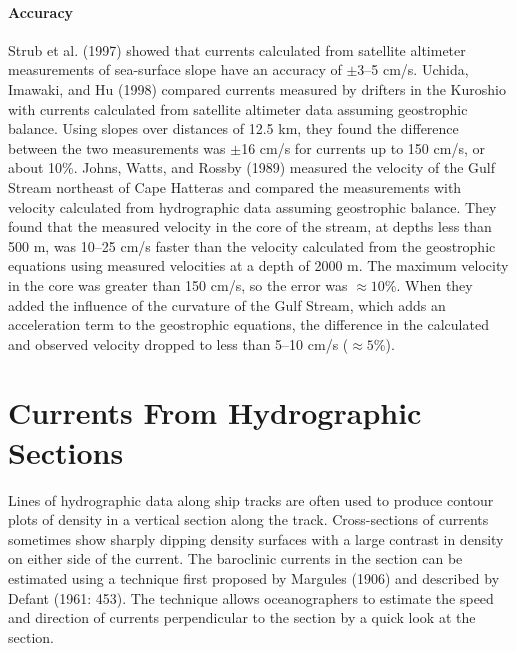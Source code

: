 \paragraph{Accuracy} Strub et al. (1997) showed that
currents calculated
from satellite altimeter measurements of sea-surface slope have an
accuracy of $\pm$3--5 cm/s. Uchida, Imawaki,
and Hu (1998) compared currents measured by drifters in the Kuroshio
with currents calculated from satellite altimeter data assuming
geostrophic balance. Using slopes over distances of 12.5 km, they
found the difference between the two measurements was $\pm$16 cm/s for
currents up to 150 cm/s, or about 10\%. Johns, Watts, and Rossby
(1989) measured the velocity of the Gulf Stream northeast of Cape Hatteras and
compared the measurements with velocity calculated from hydrographic
data assuming
geostrophic balance. They found that the measured velocity in the core
of the stream, at depths less than 500 m, was 10--25 cm/s faster than
the velocity calculated from the geostrophic equations using measured
velocities at a depth of 2000 m. The
maximum velocity in the core was greater than 150 cm/s, so the error
was $\approx 10$\%. When they added the influence of the curvature of
the Gulf Stream, which adds an acceleration term to the geostrophic
equations, the difference in the calculated and observed velocity
dropped to less than 5--10 cm/s ($\approx 5$\%).

\section{Currents From Hydrographic Sections}
Lines of hydrographic data along ship
tracks are often used to produce contour plots of density in a
vertical section along the track. Cross-sections of currents sometimes
show sharply dipping density surfaces with a large contrast in density
on either side of the current. The baroclinic currents in the section
can be estimated using a technique first proposed by Margules (1906)
and described by Defant (1961: 453). The technique allows
oceanographers to estimate the speed and direction of currents
perpendicular to the section by a quick look at the section.

